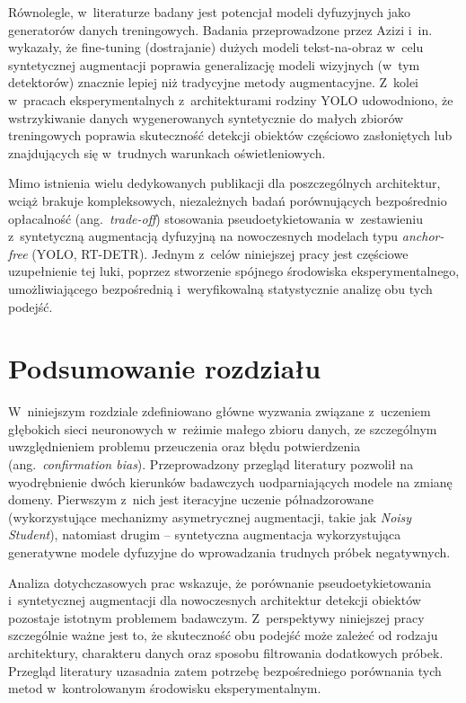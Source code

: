 Równolegle, w~literaturze badany jest potencjał modeli dyfuzyjnych jako generatorów danych treningowych. Badania przeprowadzone przez Azizi i~in.\ \cite{Azizi2023} wykazały, że fine-tuning (dostrajanie) dużych modeli tekst-na-obraz w~celu syntetycznej augmentacji poprawia generalizację modeli wizyjnych (w~tym detektorów) znacznie lepiej niż tradycyjne metody augmentacyjne. Z~kolei w~pracach eksperymentalnych z~architekturami rodziny YOLO udowodniono, że wstrzykiwanie danych wygenerowanych syntetycznie do małych zbiorów treningowych poprawia skuteczność detekcji obiektów częściowo zasłoniętych lub znajdujących się w~trudnych warunkach oświetleniowych.

Mimo istnienia wielu dedykowanych publikacji dla poszczególnych architektur, wciąż brakuje kompleksowych, niezależnych badań porównujących bezpośrednio opłacalność (ang.\ \emph{trade-off}) stosowania pseudoetykietowania w~zestawieniu z~syntetyczną augmentacją dyfuzyjną na nowoczesnych modelach typu \emph{anchor-free} (YOLO, RT-DETR). Jednym z~celów niniejszej pracy jest częściowe uzupełnienie tej luki, poprzez stworzenie spójnego środowiska eksperymentalnego, umożliwiającego bezpośrednią i~weryfikowalną statystycznie analizę obu tych podejść.

\section{Podsumowanie rozdziału}

W~niniejszym rozdziale zdefiniowano główne wyzwania związane z~uczeniem głębokich sieci neuronowych w~reżimie małego zbioru danych, ze szczególnym uwzględnieniem problemu przeuczenia oraz błędu potwierdzenia (ang.\ \emph{confirmation bias}). Przeprowadzony przegląd literatury pozwolił na wyodrębnienie dwóch kierunków badawczych uodparniających modele na zmianę domeny. Pierwszym z~nich jest iteracyjne uczenie półnadzorowane (wykorzystujące mechanizmy asymetrycznej augmentacji, takie jak \emph{Noisy Student}), natomiast drugim -- syntetyczna augmentacja wykorzystująca generatywne modele dyfuzyjne do wprowadzania trudnych próbek negatywnych. 

Analiza dotychczasowych prac wskazuje, że porównanie pseudoetykietowania i~syntetycznej augmentacji dla nowoczesnych architektur detekcji obiektów pozostaje istotnym problemem badawczym. Z~perspektywy niniejszej pracy szczególnie ważne jest to, że skuteczność obu podejść może zależeć od rodzaju architektury, charakteru danych oraz sposobu filtrowania dodatkowych próbek. Przegląd literatury uzasadnia zatem potrzebę bezpośredniego porównania tych metod w~kontrolowanym środowisku eksperymentalnym.
